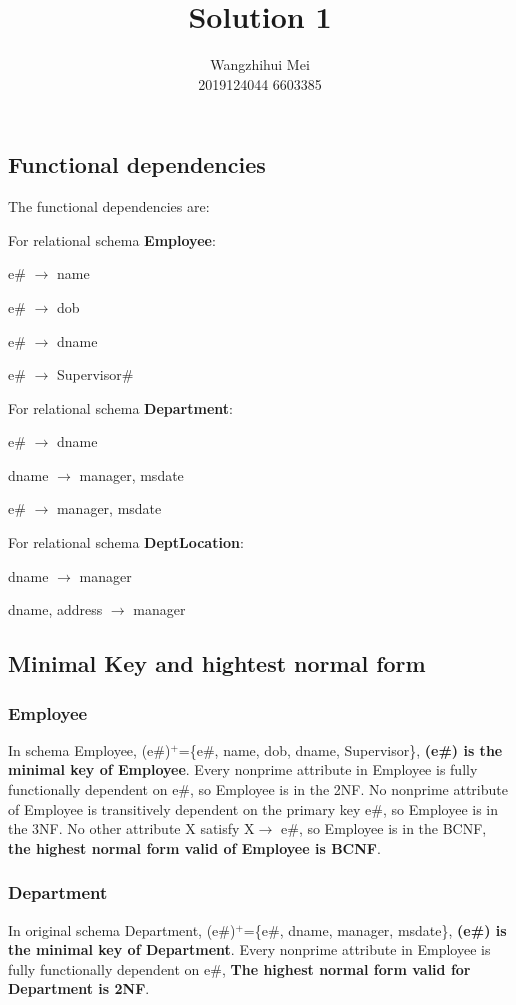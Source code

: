 \documentclass[12pt]{article}%
\begin{document}
\title{Solution 1}
\author{Wangzhihui Mei \\ 2019124044 6603385}
\date{}
\maketitle

\subsection*{Functional dependencies}
The functional dependencies are:

\noindent For relational schema \textbf{Employee}:

e\# $\rightarrow$ name 

e\# $\rightarrow$ dob

e\# $\rightarrow$ dname

e\# $\rightarrow$ Supervisor\#

\noindent For relational schema \textbf{Department}:

e\# $\rightarrow$ dname

dname $\rightarrow$ manager, msdate

e\# $\rightarrow$ manager, msdate

\noindent For relational schema \textbf{DeptLocation}:

dname $\rightarrow$ manager

dname, address $\rightarrow$ manager

\subsection*{Minimal Key and hightest normal form}
\subsubsection*{Employee}
\noindent In schema Employee, (e\#)$^+$=\{e\#, name, dob, dname, Supervisor\}, \textbf{(e\#) is the minimal key of Employee}. 
Every nonprime attribute in Employee is fully functionally dependent on e\#, so Employee is in the 2NF.
No nonprime attribute of Employee is transitively dependent on the primary key e\#, so Employee is in the 3NF.
No other attribute X satisfy X$\rightarrow$ e\#, so Employee is in the BCNF, \textbf{the highest normal form valid of Employee is BCNF}.

\subsubsection*{Department}
\noindent In original schema Department, (e\#)$^+$=\{e\#, dname, manager, msdate\}, \textbf{(e\#) is the minimal key of Department}. Every nonprime attribute in Employee is fully functionally dependent on e\#, \textbf{The highest normal form valid for Department is 2NF}. 
\end{document}
